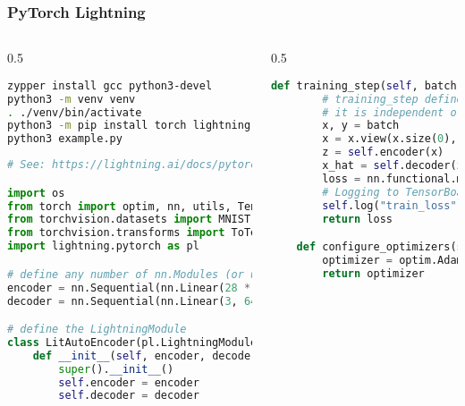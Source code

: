 \documentclass[
	notes=none,
	aspectratio=169
]{beamer}
\begin{document}

\begin{frame}[fragile]
\frametitle{PyTorch Lightning}

\begin{columns}[T]
\begin{column}[T]{0.5\textwidth}
\setlength{\parskip}{0.5em}

\vspace{0.6cm}
\begin{lstlisting}[language=sh]
zypper install gcc python3-devel
python3 -m venv venv
. ./venv/bin/activate
python3 -m pip install torch lightning torchvision
python3 example.py
\end{lstlisting}

\vspace{0.2cm}
\begin{lstlisting}[language=python]
# See: https://lightning.ai/docs/pytorch/stable/starter/introduction.html

import os
from torch import optim, nn, utils, Tensor
from torchvision.datasets import MNIST
from torchvision.transforms import ToTensor
import lightning.pytorch as pl

# define any number of nn.Modules (or use your current ones)
encoder = nn.Sequential(nn.Linear(28 * 28, 64), nn.ReLU(), nn.Linear(64, 3))
decoder = nn.Sequential(nn.Linear(3, 64), nn.ReLU(), nn.Linear(64, 28 * 28))

# define the LightningModule
class LitAutoEncoder(pl.LightningModule):
    def __init__(self, encoder, decoder):
        super().__init__()
        self.encoder = encoder
        self.decoder = decoder
\end{lstlisting}

\end{column}
\begin{column}[T]{0.5\textwidth}
\setlength{\parskip}{0.5em}

\vspace{0.6cm}
\begin{lstlisting}[language=python,firstnumber=20]
    def training_step(self, batch, batch_idx):
        # training_step defines the train loop.
        # it is independent of forward
        x, y = batch
        x = x.view(x.size(0), -1)
        z = self.encoder(x)
        x_hat = self.decoder(z)
        loss = nn.functional.mse_loss(x_hat, x)
        # Logging to TensorBoard (if installed) by default
        self.log("train_loss", loss)
        return loss

    def configure_optimizers(self):
        optimizer = optim.Adam(self.parameters(), lr=1e-3)
        return optimizer


\end{lstlisting}
\end{column}
\end{columns}
\end{frame}
\end{document}
